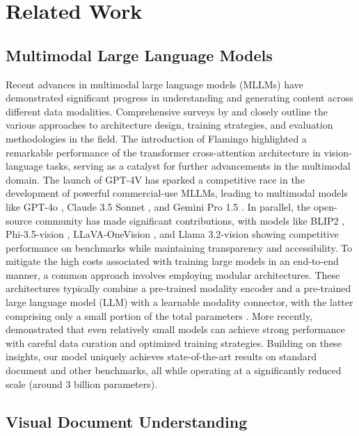 \section{Related Work}
\subsection{Multimodal Large Language Models}

Recent advances in multimodal large language models (MLLMs) have demonstrated significant progress in understanding and generating content across different data modalities. Comprehensive surveys by \cite{Yin_2024_survey} and \cite{wadekar2024evolutionmultimodalmodelarchitectures} closely outline the various approaches to architecture design, training strategies, and evaluation methodologies in the field. 
The introduction of Flamingo \citep{alayrac2022flamingo} highlighted a remarkable performance of the transformer cross-attention architecture in vision-language tasks, serving as a catalyst for further advancements in the multimodal domain. The launch of GPT-4V \citep{openai_gpt4v} has sparked a competitive race in the development of powerful commercial-use MLLMs, leading to multimodal models like GPT-4o \citep{openai_gpt4o}, Claude 3.5 Sonnet \citep{anthropic_claude3_5}, and Gemini Pro 1.5 \citep{geminiteam2024gemini15}. In parallel, the open-source community has made significant contributions, with models like BLIP2 \citep{li2023blip2}, Phi-3.5-vision \citep{abdin2024phi}, LLaVA-OneVision \citep{li2024llavaonevision}, and Llama 3.2-vision \citep{grattafiori2024llama3} showing competitive performance on benchmarks while maintaining transparency and accessibility.
To mitigate the high costs associated with training large models in an end-to-end manner, a common approach involves employing modular architectures. These architectures typically combine a pre-trained modality encoder and a pre-trained large language model (LLM) with a learnable modality connector, with the latter comprising only a small portion of the total parameters \citep{bai2023qwenvl, tong2024cambrian1, chen2024internvl}. 
More recently, \cite{zhang2024mm15} demonstrated that even relatively small models can achieve strong performance with careful data curation and optimized training strategies.
Building on these insights, our model uniquely achieves state-of-the-art results on standard document and other benchmarks, all while operating at a significantly reduced scale (around 3 billion parameters). 

\subsection{Visual Document Understanding}

